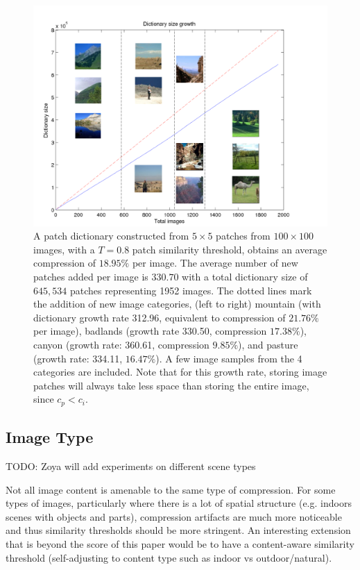  \begin{figure}
\hspace{-5mm}
\includegraphics[width=1.3\linewidth]{Figures/multiscenes.pdf}
\caption{A patch dictionary constructed from $5\times 5$ patches from $100\times 100$ images, with a $T=0.8$ patch similarity threshold, obtains an average compression of $18.95\%$ per image. The average number of new patches added per image is $330.70$ with a total dictionary size of $645,534$ patches representing 1952 images. The dotted lines mark the addition of new image categories, (left to right) mountain (with dictionary growth rate 312.96, equivalent to compression of $21.76\%$ per image), badlands (growth rate 330.50, compression $17.38\%$), canyon (growth rate: 360.61, compression $9.85\%$), and pasture (growth rate: 334.11, $16.47\%$). A few image samples from the 4 categories are included.  Note that for this growth rate, storing image patches will always take less space than storing the entire image, since $c_p < c_i$.}
\label{fig:bigsize}
\end{figure}

\subsection{Image Type}

TODO: Zoya will add experiments on different scene types

Not all image content is amenable to the same type of compression. For some types of images, particularly where there is a lot of spatial structure (e.g. indoors scenes with objects and parts), compression artifacts are much more noticeable and thus similarity thresholds should be more stringent. An interesting extension that is beyond the score of this paper would be to have a content-aware similarity threshold (self-adjusting to content type such as indoor vs outdoor/natural).

